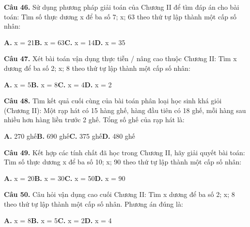 \documentclass[11pt,a4paper]{article}
\begin{document}
\textbf{\color{primary} Câu 46.} Sử dụng phương pháp giải toán của Chương II để tìm đáp án cho bài toán: Tìm số thực dương x để ba số 7; x; 63 theo thứ tự lập thành một cấp số nhân:\par
\hspace*{1.5em}\textbf{A.} x = 21\quad\quad \textbf{B.} x = 63\quad\quad \textbf{C.} x = 14\quad\quad \textbf{D.} x = 35\par\vspace{2pt}
\textbf{\color{primary} Câu 47.} Xét bài toán vận dụng thực tiễn / nâng cao thuộc Chương II: Tìm x dương để ba số 2; x; 8 theo thứ tự lập thành một cấp số nhân:\par
\hspace*{1.5em}\textbf{A.} x = 5\quad\quad \textbf{B.} x = 8\quad\quad \textbf{C.} x = 4\quad\quad \textbf{D.} x = 2\par\vspace{2pt}
\textbf{\color{primary} Câu 48.} Tìm kết quả cuối cùng của bài toán phân loại học sinh khá giỏi (Chương II): Một rạp hát có 15 hàng ghế, hàng đầu tiên có 18 ghế, mỗi hàng sau nhiều hơn hàng liền trước 2 ghế. Tổng số ghế của rạp hát là:\par
\hspace*{1.5em}\textbf{A.} 270 ghế\quad\quad \textbf{B.} 690 ghế\quad\quad \textbf{C.} 375 ghế\quad\quad \textbf{D.} 480 ghế\par\vspace{2pt}
\textbf{\color{primary} Câu 49.} Kết hợp các tính chất đã học trong Chương II, hãy giải quyết bài toán: Tìm số thực dương x để ba số 10; x; 90 theo thứ tự lập thành một cấp số nhân:\par
\hspace*{1.5em}\textbf{A.} x = 20\quad\quad \textbf{B.} x = 30\quad\quad \textbf{C.} x = 50\quad\quad \textbf{D.} x = 90\par\vspace{2pt}
\textbf{\color{primary} Câu 50.} Câu hỏi vận dụng cao cuối Chương II: Tìm x dương để ba số 2; x; 8 theo thứ tự lập thành một cấp số nhân. Phương án đúng là:\par
\hspace*{1.5em}\textbf{A.} x = 8\quad\quad \textbf{B.} x = 5\quad\quad \textbf{C.} x = 2\quad\quad \textbf{D.} x = 4\par\vspace{2pt}
\end{document}
